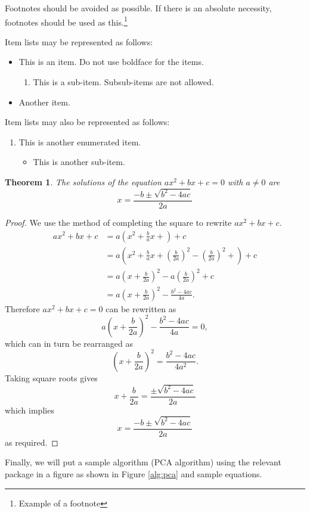 \documentclass[a4paper,onesided,12pt]{report}
\newtheorem{thm}{Theorem}[chapter]
\begin{document}
Footnotes should be avoided as possible. If there is an absolute
necessity, footnotes should be used as this.\footnote{Example of a
footnote}

Item lists may be represented as follows:

\begin{itemize}
 \item This is an item. Do not use boldface for the items.
\begin{enumerate}
 \item This is a sub-item. Subsub-items are not allowed.
\end{enumerate}
\item Another item.
\end{itemize}
Item lists may also be represented as follows:
\begin{enumerate}
 \item This is another enumerated item.
\begin{itemize}
 \item This is another sub-item.
\end{itemize}

\end{enumerate}

\begin{thm}
The solutions of the equation $ax^2+bx+c=0$ with $a\neq 0$ are
$$
x=\frac{-b\pm \sqrt{b^2-4ac}}{2a}
$$
\end{thm}


\begin{proof}
We use the method of completing the square to rewrite $ax^2+bx+c$.
\begin{align*}
ax^2+bx+c&=a\left( x^2 + \frac{b}{a}x+\right)+c \\
  &=a\left( x^2 + \frac{b}{a}x+ \left(\frac{b}{2a}\right)^2
     -\left(\frac{b}{2a}\right)^2 +\right)+c \\
  &=a\left( x+\frac{b}{2a}\right)^2 -
a\left(\frac{b}{2a}\right)^2+c\\
  &= a\left( x+\frac{b}{2a}\right)^2- \frac{b^2-4ac}{4a}.
\end{align*}
Therefore $ax^2+bx+c=0$ can be rewritten as
$$
a\left( x+\frac{b}{2a}\right)^2- \frac{b^2-4ac}{4a}=0,
$$
which can in turn  be rearranged as
$$
\left( x+\frac{b}{2a}\right)^2= \frac{b^2-4ac}{4a^2}.
$$
Taking square roots gives
$$
x+\frac{b}{2a}= \frac{\pm \sqrt{b^2-4ac}}{2a}
$$
which implies
$$
x=\frac{-b\pm \sqrt{b^2-4ac}}{2a}
$$
as required.
\end{proof}
Finally, we will put a sample algorithm (PCA algorithm) using the
relevant package in a figure as shown in Figure \ref{alg:pca} and
sample equations.
\end{document}
